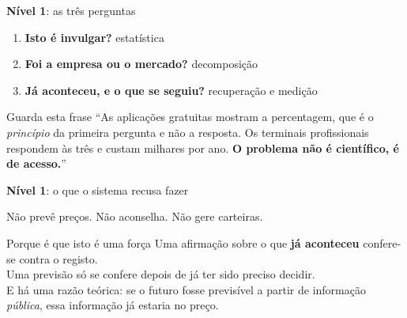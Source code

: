 \documentclass[aspectratio=169]{beamer}
\newcommand{\key}[1]{\textbf{\textcolor{blue!55!black}{#1}}}
\begin{document}
\begin{frame}{\key{Nível 1}: as três perguntas}
\begin{enumerate}
  \item \key{Isto é invulgar?} estatística
  \item \key{Foi a empresa ou o mercado?} decomposição
  \item \key{Já aconteceu, e o que se seguiu?} recuperação e medição
\end{enumerate}
\vspace{4mm}
\begin{block}{Guarda esta frase}
``As aplicações gratuitas mostram a percentagem, que é o \emph{princípio} da primeira pergunta e não
a resposta. Os terminais profissionais respondem às três e custam milhares por ano.
\textbf{O problema não é científico, é de acesso.}''
\end{block}
\end{frame}

\begin{frame}{\key{Nível 1}: o que o sistema recusa fazer}
\begin{center}
\Large Não prevê preços. Não aconselha. Não gere carteiras.
\end{center}
\vspace{5mm}
\begin{block}{Porque é que isto é uma força}
Uma afirmação sobre o que \textbf{já aconteceu} confere-se contra o registo.\\
Uma previsão só se confere depois de já ter sido preciso decidir.\\[2mm]
E há uma razão teórica: se o futuro fosse previsível a partir de informação \emph{pública}, essa
informação já estaria no preço.
\end{block}
\end{frame}
\end{document}
